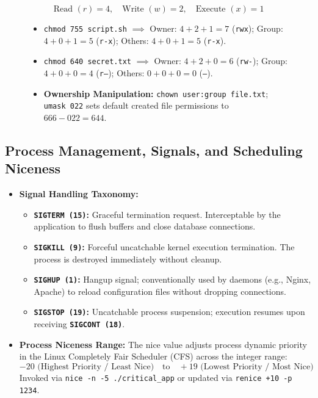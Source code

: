 \begin{figure}[htbp]
\centering
\begin{tcolorbox}[colback=codebg, colframe=primary, title=\textbf{Octal Permission Weight Calculation}]
\begin{equation}
\text{Read } (r) = 4, \quad \text{Write } (w) = 2, \quad \text{Execute } (x) = 1
\end{equation}
\begin{itemize}
    \item \texttt{chmod 755 script.sh} $\implies$ Owner: $4+2+1=7$ (\texttt{rwx}); Group: $4+0+1=5$ (\texttt{r-x}); Others: $4+0+1=5$ (\texttt{r-x}).
    \item \texttt{chmod 640 secret.txt} $\implies$ Owner: $4+2+0=6$ (\texttt{rw-}); Group: $4+0+0=4$ (\texttt{r--}); Others: $0+0+0=0$ (\texttt{---}).
    \item \textbf{Ownership Manipulation:} \texttt{chown user:group file.txt}; \texttt{umask 022} sets default created file permissions to $666 - 022 = 644$.
\end{itemize}
\end{tcolorbox}
\end{figure}

\subsection{Process Management, Signals, and Scheduling Niceness}
\begin{itemize}
    \item \textbf{Signal Handling Taxonomy:}
    \begin{itemize}
        \item \textbf{\texttt{SIGTERM (15)}:} Graceful termination request. Interceptable by the application to flush buffers and close database connections.
        \item \textbf{\texttt{SIGKILL (9)}:} Forceful uncatchable kernel execution termination. The process is destroyed immediately without cleanup.
        \item \textbf{\texttt{SIGHUP (1)}:} Hangup signal; conventionally used by daemons (e.g., Nginx, Apache) to reload configuration files without dropping connections.
        \item \textbf{\texttt{SIGSTOP (19)}:} Uncatchable process suspension; execution resumes upon receiving \textbf{\texttt{SIGCONT (18)}}.
    \end{itemize}
    \item \textbf{Process Niceness Range:} The nice value adjusts process dynamic priority in the Linux Completely Fair Scheduler (CFS) across the integer range:
    \begin{equation}
    \boxed{-20 \text{ (Highest Priority / Least Nice)} \quad \text{to} \quad +19 \text{ (Lowest Priority / Most Nice)}}
    \end{equation}
    Invoked via \texttt{nice -n -5 ./critical\_app} or updated via \texttt{renice +10 -p 1234}.
\end{itemize}

